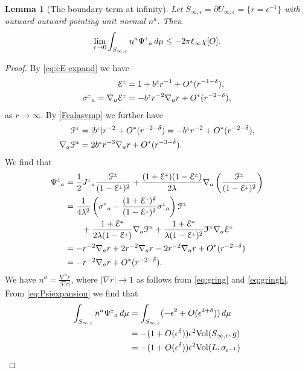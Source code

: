 \documentclass[a4paper,11pt,reqno]{amsart}
\newcommand{\cE}{\mathcal{E}}
\theoremstyle{plain}
\newtheorem{lemma}[thm]{Lemma}
\newcommand{\PM}[1]{{{#1}^{\hspace{-.5pt}\scaleto{\pm}{3.5pt}}}}
\newcommand{\MP}[1]{{{#1}^{\hspace{-.5pt}\scaleto{\mp}{3.5pt}}}}
\def\Fcal{\mathcal{F}}
\def\Ecal{\mathcal{E}}
\numberwithin{equation}{section}
\newcommand{\eps}{\epsilon}
\begin{document}
%
%

\begin{lemma}[The boundary term at infinity] \label{lem:bdrinfty} 
Let $S_{\infty,\epsilon} = \partial U_{\infty,\epsilon} = \{ r = \eps^{-1}\}$ with outward outward-pointing unit normal $n^a$. Then
\begin{align}
\lim_{\eps \to 0}
\int_{S_{\infty,\epsilon}} n^a\PM{\Psi}_a \, d\mu
\leq -2\pi \ell_\infty \chi[O]. 
\end{align}
\end{lemma} 

\begin{proof} 
By \eqref{eq:cE-expand} we have
\begin{align}
\PM{\cE} &= 1 + \PM{b} r^{-1} + O^*(r^{-1- \delta}), \\
\PM{\sigma}_{a} = \nabla_a \PM{\cE}
&= -\PM{b} r^{-2} \nabla_a r + O^*(r^{-2- \delta}),
\end{align}
as $r \to \infty$. 
%
%
%
%
%
%
%
By \eqref{Fcalasymp} we further have 
\begin{align}
\PM{\Fcal}
&=|\PM{b}| r^{-2} + O^*(r^{-2-\delta})
=-\PM{b} r^{-2} + O^*(r^{-2-\delta}), \\
\nabla_a \PM{\Fcal}
&= 2\PM{b} r^{-3} \nabla_a r + O^*(r^{-3-\delta}).
\end{align}
We find that
\begin{align}
\PM{\Psi}_a
&=
\frac{1}{2} \PM{J}_a \frac{\PM{\Fcal}}{(1-\PM{\Ecal})^2}
+ \frac{(1 + \MP{\Ecal}) (1 -  \PM{\Ecal})}{2\lambda}
\nabla_a \left(\frac{\PM{\Fcal}}{(1-\PM{\Ecal})^2} \right)\\
&=
\frac{1}{4 \lambda^2} \left(
\MP{\sigma}_{a} - \frac{(1 + \MP{\Ecal})^2}{(1 - \PM{\Ecal})^2} \PM{\sigma}_{a}
\right) \PM{\Fcal} \\
&\qquad
+ \frac{1 + \MP{\Ecal}}{2\lambda(1-\PM{\Ecal})}
\nabla_a \PM{\Fcal}
+ \frac{1 + \MP{\Ecal}}{\lambda(1-\PM{\Ecal})^2}
\PM{\Fcal} \nabla_a \PM{\cE} \\
&=
- r^{-2} \nabla_a r + 2r^{-2} \nabla_a r - 2r^{-2} \nabla_a r + O^*(r^{-2-\delta})\\
&=
- r^{-2} \nabla_a r + O^*(r^{-2-\delta}) \label{eq:Psiexpansion}.
\end{align}
We have 
$n^a=\frac{\nabla^a r}{|\nabla r|}$, where $|\nabla r| \to 1$ as follows from \eqref{eq:gring} and \eqref{eq:gringh}. From \eqref{eq:Psiexpansion} we find that 
\begin{align}
\int_{S_{\infty,\epsilon}} n^a\PM{\Psi}_a \, d\mu
&= \int_{S_{\infty,\epsilon}}(-\eps^2 + O(\eps^{2 + \delta})) \, d\mu \\
&= - (1 + O(\eps^{\delta})) \eps^2 \mathrm{Vol}(S_{\infty,\epsilon},g) \\
&= - (1 + O(\eps^{\delta})) \eps^2 \mathrm{Vol}(L, \sigma_{\eps^{-1}}) %
%
\end{align}


\end{proof}
\end{document}
